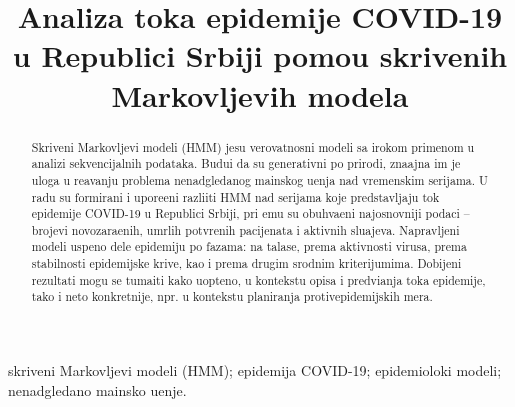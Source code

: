 \documentclass[cyr]{simposium}
\begin{document}
\begin{frontmatter}

\title{ Analiza toka epidemije {\Lat COVID-19} u Republici Srbiji pomo\cc u skrivenih Markovljevih modela}

\author{{ }}
\address{Matemati\ch ki fakultet, Univerzitet u Beogradu, Student{}ski trg 16, Beograd\\
}



\maketitle

\begin{abstract}
    Skriveni Markovljevi modeli ({\Lat HMM}) jesu verovatnosni modeli sa \sh irokom primenom u analizi sekvencijalnih podataka. Budu\cc i da su generativni po prirodi, zna\ch ajna im je uloga u re\sh avanju problema nenadgledanog ma\sh inskog u\ch enja nad vremenskim serijama. U radu su formirani i upore\dj eni razli\ch iti {\Lat HMM} nad serijama koje predstavljaju tok epidemije {\Lat COVID-19} u Republici Srbiji, pri \ch emu su obuhva\cc eni najosnovniji podaci -- brojevi novozara\zh enih, umrlih potvr\dj enih pacijenata i aktivnih slu\ch ajeva. Napravljeni modeli uspe\sh no dele epidemiju po fazama: na talase, prema aktivnosti virusa, prema stabilnosti epidemijske krive, kao i prema drugim srodnim kriterijumima. Dobijeni rezultati mogu se tuma\ch iti kako uop\sh teno, u kontekstu opisa i predvi\dj anja toka epidemije, tako i ne\sh to konkretnije, npr. u kontekstu planiranja protivepidemijskih mera.
\end{abstract}
\begin{keyword}
   skriveni Markovljevi modeli ({\Lat HMM}); epidemija {\Lat COVID-19}; epidemiolo\sh ki modeli; nenadgledano ma\sh insko u\ch enje.
\end{keyword}
\end{frontmatter}
\end{document}
